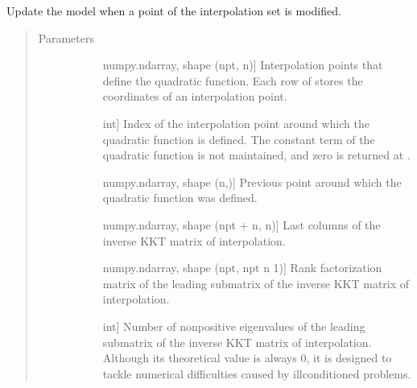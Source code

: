 \documentclass[letterpaper,10pt,english]{sphinxmanual}
\begin{document}
\begin{fulllineitems}
\begin{fulllineitems}
\label{\detokenize{refs/generated/cobyqa.optimize.Quadratic.update:cobyqa.optimize.Quadratic.update}}
\sphinxAtStartPar
Update the model when a point of the interpolation set is modified.
\begin{quote}\begin{description}
\item[{Parameters}] \leavevmode\begin{description}
\item[{}] \leavevmode{[}numpy.ndarray, shape (npt, n){]}
\sphinxAtStartPar
Interpolation points that define the quadratic function. Each row of
 stores the coordinates of an interpolation point.

\item[{}] \leavevmode{[}int{]}
\sphinxAtStartPar
Index of the interpolation point around which the quadratic function
is defined. The constant term of the quadratic function is not
maintained, and zero is returned at .

\item[{}] \leavevmode{[}numpy.ndarray, shape (n,){]}
\sphinxAtStartPar
Previous point around which the quadratic function was defined.

\item[{}] \leavevmode{[}numpy.ndarray, shape (npt + n, n){]}
\sphinxAtStartPar
Last  columns of the inverse KKT matrix of interpolation.

\item[{}] \leavevmode{[}numpy.ndarray, shape (npt, npt \sphinxhyphen{} n \sphinxhyphen{} 1){]}
\sphinxAtStartPar
Rank factorization matrix of the leading  submatrix of the
inverse KKT matrix of interpolation.

\item[{}] \leavevmode{[}int{]}
\sphinxAtStartPar
Number of nonpositive eigenvalues of the leading  submatrix
of the inverse KKT matrix of interpolation. Although its theoretical
value is always 0, it is designed to tackle numerical difficulties
caused by ill\sphinxhyphen{}conditioned problems.


\end{description}
\end{description}
\end{quote}
\end{fulllineitems}
\end{fulllineitems}
\end{document}
